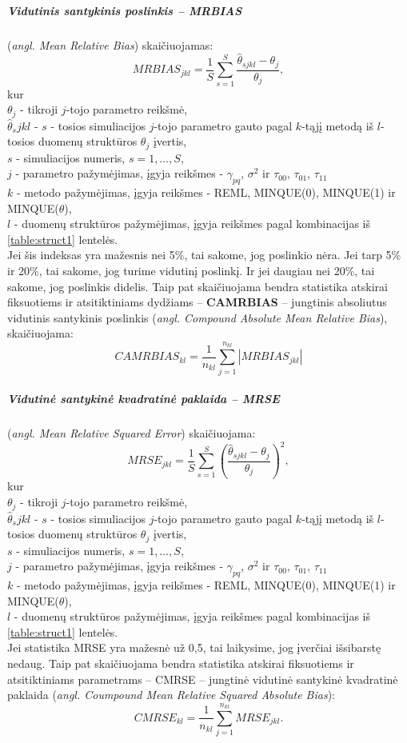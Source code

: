 \documentclass[12pt,a4paper]{article}
\begin{document}
\subparagraph{Vidutinis santykinis poslinkis -- MRBIAS} (\textit{angl. Mean Relative Bias}) skaičiuojamas:
\[
MRBIAS_{jkl}=\frac{1}{S}\sum_{s=1}^S\frac{\hat{\theta}_{sjkl}-\theta_j}{\theta_j},
\]
kur \\
$\theta_j$ - tikroji $j$-tojo parametro reikšmė, \\
$\hat{\theta}_sjkl$ - $s$ - tosios simuliacijos $j$-tojo parametro gauto pagal $k$-tąjį metodą iš $l$-tosios duomenų struktūros $\theta_j$ įvertis,\\
$s$ - simuliacijos numeris, $s=1,\dots,S$,\\
$j$ - parametro pažymėjimas, įgyja reikšmes - $\gamma_{pq}$, $\sigma^2$ ir $\tau_{00}$,  $\tau_{01}$,  $\tau_{11}$\\
$k$ - metodo pažymėjimas, įgyja reikšmes - REML, MINQUE(0), MINQUE(1) ir MINQUE($\theta$),\\
$l$ - duomenų struktūros pažymėjimas, įgyja reikšmes pagal kombinacijas iš \ref{table:struct1} lentelės.\\
\indent Jei šis indeksas yra mažesnis nei 5\%, tai sakome, jog poslinkio nėra. Jei tarp 5\% ir 20\%, tai sakome, jog turime vidutinį poslinkį. Ir jei daugiau nei 20\%, tai sakome, jog poslinkis didelis. Taip pat skaičiuojama bendra statistika atskirai fiksuotiems ir atsitiktiniams dydžiams -- \textbf{CAMRBIAS} -- jungtinis absoliutus vidutinis santykinis poslinkis (\textit{angl. Compound Absolute Mean Relative Bias}), skaičiuojama:
\[
CAMRBIAS_{kl}=\frac{1}{n_{kl}}\sum_{j=1}^{n_{kl}}\left|MRBIAS_{jkl}\right|
\]


\subparagraph{Vidutinė santykinė kvadratinė paklaida -- MRSE } (\textit{angl.  Mean Relative Squared Error}) skaičiuojama: 
\[
MRSE_{jkl}=\frac{1}{S}\sum_{s=1}^S\left(\frac{\hat{\theta}_{sjkl}-\theta_j}{\theta_j}\right)^2,
\]
kur \\
$\theta_j$ - tikroji $j$-tojo parametro reikšmė, \\
$\hat{\theta}_sjkl$ - $s$ - tosios simuliacijos $j$-tojo parametro gauto pagal $k$-tąjį metodą iš $l$-tosios duomenų struktūros $\theta_j$ įvertis,\\
$s$ - simuliacijos numeris, $s=1,\dots,S$,\\
$j$ - parametro pažymėjimas, įgyja reikšmes - $\gamma_{pq}$, $\sigma^2$ ir $\tau_{00}$,  $\tau_{01}$,  $\tau_{11}$\\
$k$ - metodo pažymėjimas, įgyja reikšmes - REML, MINQUE(0), MINQUE(1) ir MINQUE($\theta$),\\
$l$ - duomenų struktūros pažymėjimas, įgyja reikšmes pagal kombinacijas iš \ref{table:struct1} lentelės.\\
\indent Jei statistika MRSE yra mažesnė už 0,5, tai laikysime, jog įverčiai išsibarstę nedaug. Taip pat skaičiuojama bendra statistika atskirai fiksuotiems ir atsitiktiniams parametrams -- CMRSE -- jungtinė vidutinė santykinė kvadratinė paklaida (\textit{angl. Coumpound Mean Relative Squared Absolute Bias}):
\[
CMRSE_{kl}=\frac{1}{n_{kl}}\sum_{j=1}^{n_{kl}}MRSE_{jkl}.
\]
\end{document}
